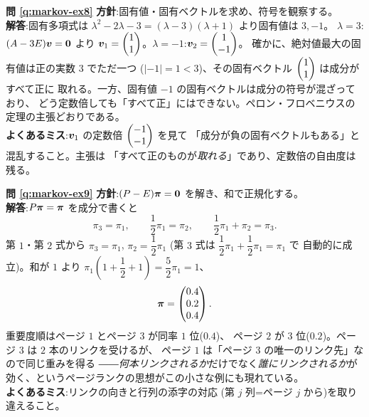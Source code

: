 \bigskip
\noindent\textbf{問 \ref{q:markov-ex8}}\quad
\textbf{方針}:固有値・固有ベクトルを求め、符号を観察する。\\
\textbf{解答}:固有多項式は $\lambda^2 - 2\lambda - 3
= (\lambda - 3)(\lambda + 1)$ より固有値は $3, -1$。
$\lambda = 3$:$(A - 3E)\bm{v} = \bm{0}$ より
$\bm{v}_1 = \begin{pmatrix}1 \\ 1\end{pmatrix}$。$\lambda = -1$:$\bm{v}_2 = \begin{pmatrix}1 \\ -1\end{pmatrix}$。
確かに、絶対値最大の固有値は正の実数 $3$ でただ一つ
($|-1| = 1 < 3$)、その固有ベクトル $\begin{pmatrix}1 \\ 1\end{pmatrix}$ は成分がすべて正に
取れる。一方、固有値 $-1$ の固有ベクトルは成分の符号が混ざっており、
どう定数倍しても「すべて正」にはできない。ペロン・フロベニウスの
定理の主張どおりである。\\
\textbf{よくあるミス}:$\bm{v}_1$ の定数倍 $\begin{pmatrix}-1 \\ -1\end{pmatrix}$ を見て
「成分が負の固有ベクトルもある」と混乱すること。主張は
「すべて正のものが\emph{取れる}」であり、定数倍の自由度は残る。

\bigskip
\noindent\textbf{問 \ref{q:markov-ex9}}\quad
\textbf{方針}:$(P - E)\bm{\pi} = \bm{0}$ を解き、和で正規化する。\\
\textbf{解答}:$P\bm{\pi} = \bm{\pi}$ を成分で書くと
\[
\pi_3 = \pi_1, \qquad \frac{1}{2}\pi_1 = \pi_2, \qquad
\frac{1}{2}\pi_1 + \pi_2 = \pi_3.
\]
第 $1$・第 $2$ 式から $\pi_3 = \pi_1$, $\pi_2 = \dfrac{1}{2}\pi_1$
(第 $3$ 式は $\dfrac{1}{2}\pi_1 + \dfrac{1}{2}\pi_1 = \pi_1$ で
自動的に成立)。和が $1$ より
$\pi_1\left(1 + \dfrac{1}{2} + 1\right) = \dfrac{5}{2}\pi_1 = 1$、
\[
\bm{\pi} = \begin{pmatrix}0.4 \\ 0.2 \\ 0.4\end{pmatrix}.
\]
重要度順はページ $1$ とページ $3$ が同率 $1$ 位($0.4$)、
ページ $2$ が $3$ 位($0.2$)。ページ $3$ は $2$ 本のリンクを受けるが、
ページ $1$ は「ページ $3$ の唯一のリンク先」なので同じ重みを得る
――\emph{何本リンクされるか}だけでなく\emph{誰にリンクされるか}が
効く、というページランクの思想がこの小さな例にも現れている。\\
\textbf{よくあるミス}:リンクの向きと行列の添字の対応
(第 $j$ 列=ページ $j$ から)を取り違えること。

